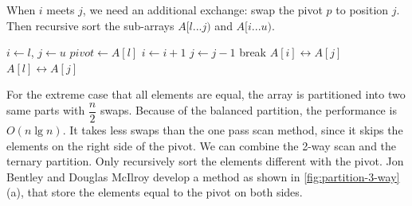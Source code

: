 \documentclass[b5paper]{article}
\begin{document}
When $i$ meets $j$, we need an additional exchange: swap the pivot $p$ to position $j$. Then recursive sort the sub-arrays $A[l ... j)$ and $A[i ... u)$.

\begin{algorithmic}[1]
 \Comment{Sort range $[l, u)$}
   
    \State $i \gets l$, $j \gets u$
    \State $pivot \gets A[l]$
    \Loop
      \Repeat
        \State $i \gets i + 1$
       
      \Repeat
        \State $j \gets j - 1$
       
        \State break
      \EndIf
      \State {} $A[i] \leftrightarrow A[j]$
    \EndLoop
    \State {} $A[l] \leftrightarrow A[j]$ 
    \State {}
    \State {}
  \EndIf
\EndProcedure
\end{algorithmic}

For the extreme case that all elements are equal, the array is partitioned into two same parts with $\dfrac{n}{2}$ swaps. Because of the balanced partition, the performance is $O(n \lg n)$. It takes less swaps than the one pass scan method, since it skips the elements on the right side of the pivot. We can combine the 2-way scan and the ternary partition. Only recursively sort the elements different with the pivot. Jon Bentley and Douglas McIlroy develop a method as shown in \cref{fig:partition-3-way} (a), that store the elements equal to the pivot on both sides\cite{3-way-part}\cite{opt-qs}.
\end{document}
